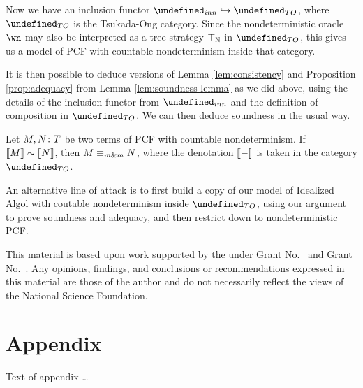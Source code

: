 \documentclass[sigplan,10pt,review]{acmart}\settopmatter{printfolios=true,printccs=false,printacmref=false}
\let\G\undefined
\begin{document}
Now we have an inclusion functor $\G_{inn}\hookrightarrow\G_{TO}$, where $\G_{TO}$ is the Tsukada-Ong category.  
Since the nondeterministic oracle $\wn$ may also be interpreted as a tree-strategy $\top_{\mathbb{N}}$ in $\G_{TO}$, this gives us a model of PCF with countable nondeterminism inside that category.  

It is then possible to deduce versions of Lemma \ref{lem:consistency} and Proposition \ref{prop:adequacy} from Lemma \ref{lem:soundness-lemma} as we did above, using the details of the inclusion functor from $\G_{inn}$ and the definition of composition in $\G_{TO}$.  
We can then deduce soundness in the usual way.

\begin{theorem}
  Let $M,N\colon T$ be two terms of PCF with countable nondeterminism.
  If $\left\llbracket M\right\rrbracket\sim \left\llbracket N\right\rrbracket$, then $M\equiv_{m\&m} N$, where the denotation $\left\llbracket-\right\rrbracket$ is taken in the category $\G_{TO}$.  
\end{theorem}

An alternative line of attack is to first build a copy of our model of Idealized Algol with coutable nondeterminism inside $\G_{TO}$, using our argument to prove soundness and adequacy, and then restrict down to nondeterministic PCF.

\begin{acks}                            %
  This material is based upon work supported by the
   under Grant
  No.~ and Grant
  No.~.  Any opinions, findings, and
  conclusions or recommendations expressed in this material are those
  of the author and do not necessarily reflect the views of the
  National Science Foundation.
\end{acks}





\appendix
\section{Appendix}

Text of appendix \ldots
\end{document}
